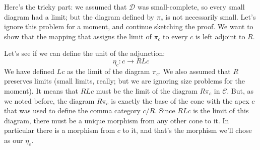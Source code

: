 \documentclass[11pt]{amsart}
\begin{document}
Here's the tricky part: we assumed that $\mathcal D$ was small-complete, so every small diagram had a limit; but the diagram defined by $\pi_c$ is not necessarily small. Let's ignore this problem for a moment, and continue sketching the proof. We want to show that the mapping that assigns the limit of $\pi_c$ to every $c$ is left adjoint to $R$. 

Let's see if we can define the unit of the adjunction:
\[ \eta_c : c \to R L c\]
We have defined $L c$ as the limit of the diagram $\pi_c$. We also assumed that $R$ preserves limits (small limits, really; but we are ignoring size problems for the moment). It means that $R L c$ must be the limit of the diagram $R \pi_c$ in $\mathcal C$. But, as we noted before, the diagram  $R \pi_c$ is exactly the base of the cone with the apex $c$ that was used to define the comma category $c/R$. Since $R L c$ is the limit of this diagram, there must be a unique morphism from any other cone to it. In particular there is a morphism from $c$ to it, and that's the morphism we'll chose as our $\eta_c$. 
\end{document}
